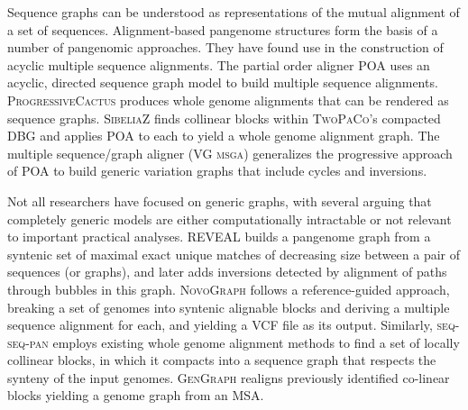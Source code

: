Sequence graphs \cite{hein1989new} can be understood as representations of the mutual alignment of a set of sequences.
Alignment-based pangenome structures form the basis of a number of pangenomic approaches.
They have found use in the construction of acyclic multiple sequence alignments.
The partial order aligner \textsc{POA} \cite{Lee_2002,Grasso_2004} uses an acyclic, directed sequence graph model to build multiple sequence alignments.
\textsc{ProgressiveCactus} \cite{Armstrong_2019} produces whole genome alignments that can be rendered as sequence graphs.
\textsc{SibeliaZ} \cite{Minkin_2019} finds collinear blocks within \textsc{TwoPaCo}'s compacted DBG and applies \textsc{POA} to each to yield a whole genome alignment graph.
The multiple sequence/graph aligner (\textsc{VG msga}) \cite{Novak_2017a,Garrison_2018,Garrison_2019} generalizes the progressive approach of \textsc{POA} to build generic variation graphs that include cycles and inversions.

Not all researchers have focused on generic graphs, with several arguing that completely generic models are either computationally intractable or not relevant to important practical analyses.
\textsc{REVEAL} \cite{linthorst2015scalable} builds a pangenome graph from a syntenic set of maximal exact unique matches of decreasing size between a pair of sequences (or graphs), and later adds inversions detected by alignment of paths through bubbles in this graph.
\textsc{NovoGraph} \cite{Biederstedt2018} follows a reference-guided approach, breaking a set of genomes into syntenic alignable blocks and deriving a multiple sequence alignment for each, and yielding a VCF file as its output.
Similarly, \textsc{seq-seq-pan} \cite{Jandrasits_2018} employs existing whole genome alignment methods to find a set of locally collinear blocks, in which it compacts into a sequence graph that respects the synteny of the input genomes.
\textsc{GenGraph} \cite{Ambler_2019} realigns previously identified co-linear blocks yielding a genome graph from an MSA.

